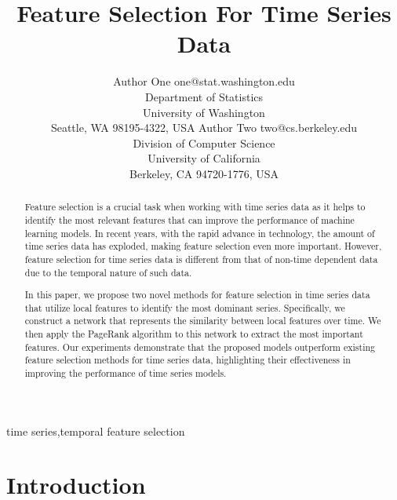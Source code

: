 \documentclass[twoside,11pt]{article}
\begin{document}
\title{Feature Selection For Time Series Data}

\author{\name Author One \email one@stat.washington.edu \\
  \addr Department of Statistics\\
  University of Washington\\
  Seattle, WA 98195-4322, USA
  \AND
  \name Author Two \email two@cs.berkeley.edu \\
  \addr Division of Computer Science\\
  University of California\\
  Berkeley, CA 94720-1776, USA}


\maketitle

\begin{abstract}%
  Feature selection is a crucial task when working with time series data as it helps to identify
  the most relevant features that can improve the performance of machine learning models.
  In recent years, with the rapid advance in technology, the amount of time series data has
  exploded, making feature selection even more important. However, feature selection for
  time series data is different from that of non-time dependent data due to the temporal
  nature of such data.

  In this paper, we propose two novel methods for feature selection in time series data that utilize local features to identify the most dominant series. Specifically, we construct a network that represents the similarity between local features over time. We then apply the PageRank algorithm to this network to extract the most important features. Our experiments demonstrate that the proposed models outperform existing feature selection methods for time series data, highlighting their effectiveness in improving the performance of time series models.
\end{abstract}

\begin{keywords}
  time series,temporal feature selection
\end{keywords}

\section{Introduction}
\end{document}

